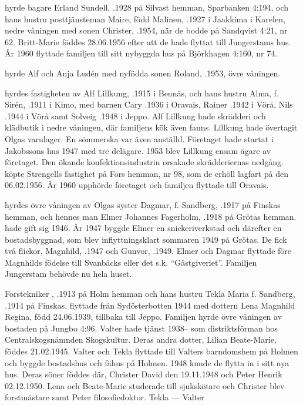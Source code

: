  hyrde bagare Erland Sundell, .1928 på Silvast hemman, Sparbanken 4:194, och hans hustru posttjänsteman Maire, född Malinen, .1927 i Jaakkima i Karelen, nedre våningen med sonen Christer, .1954, när de bodde på Sandqvist 4:21, nr 62.  Britt-Marie föddes 28.06.1956 efter att de hade flyttat till Jungerstams hus. År 1960 flyttade familjen till sitt nybyggda hus på Björkhagen 4:160, nr 74.

 hyrde Alf och Anja Ludén med nyfödda sonen Roland, .1953, övre våningen.

 hyrdes fastigheten av Alf Lillkung, .1915  i Bennäs, och hans hustru Alma, f. Sirén, .1911 i Kimo, med barnen Cary .1936 i Oravais, Rainer .1942 i Vörå, Nils .1944 i Vörå samt Solveig .1948 i Jeppo. Alf Lillkung hade skrädderi och klädbutik i nedre våningen, där familjens kök även fanns.  Lillkung hade övertagit Olgas varulager. En sömmerska var även anställd. Företaget hade startat i Jakobssons hus 1947 med tre delägare. 1953 blev Lillkung ensam ägare av företaget. Den ökande konfektionsindustrin orsakade skrädderiernas nedgång.  köpte Strengells fastighet på Fors hemman, nr 98, som de erhöll lagfart på den 06.02.1956. År 1960 upphörde företaget och familjen flyttade till Oravais.

 hyrdes övre våningen av Olgas syster Dagmar, f. Sandberg, .1917 på Finskas hemman, och hennes man Elmer Johannes Fagerholm, .1918 på Grötas hemman.  hade gift sig 1946. År 1947 byggde Elmer en snickeriverkstad och därefter en bostadsbyggnad, som blev inflyttningsklart sommaren 1949 på Grötas.  De fick två flickor, Magnhild, .1947 och Gunvor, .1949. Elmer och Dagmar flyttade före Magnhilds födelse till Svanbäcks eller det s.k. ``Gästgiveriet''. Familjen Jungerstam behövde nu hela huset.

  Forstekniker , .1913 på Holm hemman och hans hustru Tekla Maria f. Sandberg, .1914 på Finskas, flyttade från Sydösterbotten 1944 med dottern Lena Magnhild Regina, född 24.06.1939, tillbaka till Jeppo. Familjen hyrde övre våningen av bostaden på Jungbo 4:96. Valter hade tjänst 1938-- som distriktsförman hos Centralskogsnämnden Skogskultur. Deras andra dotter, Lilian Beate-Marie, föddes 21.02.1945. Valter och Tekla flyttade till Valters barndomshem på Holmen och byggde bostadshus och fähus på Holmen. 1948 kunde de flytta in i sitt nya hus. Deras söner föddes där, Christer David den 19.11.1948 och Peter Henrik 02.12.1950. Lena och Beate-Marie studerade till sjukskötare och Christer blev forstmästare samt Peter filosofiedoktor.
Tekla   ---  Valter 

